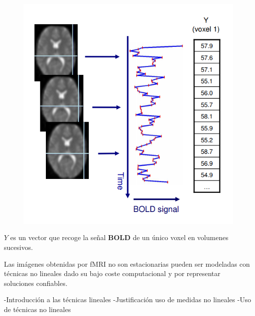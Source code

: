  	\begin{figure}[H]
  		\centering
    	\includegraphics[scale=0.5]{img/glm.png}
  		\caption{}         \label{preproc:glm}
	\end{figure}

$Y$ es un vector que recoge la señal \textbf{BOLD} de un único voxel en volumenes sucesivos.
	
 Las imágenes obtenidas por fMRI no son estacionarias pueden ser modeladas con técnicas no lineales dado su bajo coste computacional y por representar soluciones confiables. 

-Introducción a las técnicas lineales
-Justificación uso de medidas no lineales
-Uso de técnicas no lineales
